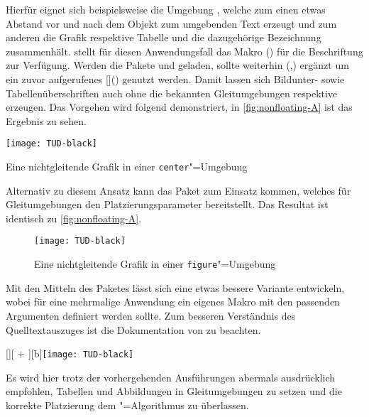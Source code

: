 \documentclass[%
  english,ngerman,%
  cdgeometry=no,DIV=12,automark%
]{tudscrartcl}
\begin{document}
Hierfür eignet sich beispielsweise die Umgebung , welche 
zum einen etwas Abstand vor und nach dem Objekt zum umgebenden Text erzeugt 
und zum anderen die Grafik respektive Tabelle und die dazugehörige Bezeichnung 
zusammenhält. \KOMAScript{} stellt für diesen Anwendungsfall das Makro 
() für die Beschriftung zur Verfügung. 
Werden die Pakete  und  geladen, sollte 
weiterhin (,) ergänzt um 
ein zuvor aufgerufenes  
[]()
genutzt werden. Damit lassen sich Bildunter- sowie Tabellenüberschriften auch 
ohne die bekannten Gleitumgebungen  respektive 
 erzeugen. Das Vorgehen wird folgend demonstriert, in 
\autoref{fig:nonfloating-A} ist das Ergebnis zu sehen.
%
\begin{Hint}
\begin{center}
\captionsetup{type=figure}
\texttt{[image: TUD-black]}
\caption{Eine nichtgleitende Grafik in einer \texttt{center}"=Umgebung}
\label{fig:nonfloating-A}
\end{center}

\end{Hint}
\InputCode\noindent
%
Alternativ zu diesem Ansatz kann das Paket  zum Einsatz kommen, 
welches für Gleitumgebungen den Platzierungsparameter  
bereitstellt. Das Resultat ist identisch zu \autoref{fig:nonfloating-A}.
%
\begin{Hint}
\begin{figure}[H]
\texttt{[image: TUD-black]}
\caption{Eine nichtgleitende Grafik in einer \texttt{figure}"=Umgebung}
\label{fig:nonfloating-B}
\end{figure}

\end{Hint}
%
Mit den Mitteln des Paketes  lässt sich eine etwas bessere 
Variante entwickeln, wobei für eine mehrmalige Anwendung ein eigenes Makro mit 
den passenden Argumenten definiert werden sollte. Zum besseren Verständnis des 
Quelltextauszuges ist die Dokumentation von  zu beachten.
%
\begin{Hint}
[\FBwidth][%
  \dimexpr\FBheight+\abovedisplayskip\relax%
][b]{\texttt{[image: TUD-black]}}{%
  \caption{%
    Eine nichtgleitende Grafik mit \texttt{\textbackslash floatbox}%
  }%
  \label{fig:nonfloating-C}%
}
\end{Hint}
\InputCode\noindent
%
Es wird hier trotz der vorhergehenden Ausführungen abermals ausdrücklich 
empfohlen, Tabellen und Abbildungen in Gleitumgebungen zu setzen und die 
korrekte Platzierung dem "=Algorithmus zu überlassen.
\end{document}
